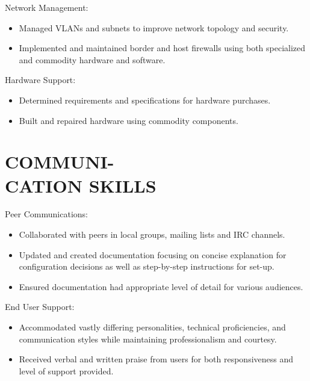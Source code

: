 \documentclass[line,margin]{res}
\begin{document}
\begin{resume}
    Network Management:
    \vspace{1 mm}
    \begin{itemize} \itemsep -1.5pt %
        \item Managed VLANs and subnets to improve network topology and
        security.
        \item Implemented and maintained border and host firewalls using
        both specialized and commodity hardware and software.
    \end{itemize}
    \vspace{-3 mm}

    Hardware Support:
    \vspace{1 mm}
    \begin{itemize} \itemsep -1.5pt %
        \item Determined requirements and specifications for hardware purchases.
        \item Built and repaired hardware using commodity components.
    \end{itemize}


\section{COMMUNI- \\ CATION SKILLS}

    Peer Communications:
    \vspace{1 mm}
    \begin{itemize} \itemsep -1.5pt %
        \item Collaborated with peers in local groups, mailing lists and
        IRC channels.
        \item Updated and created documentation focusing on concise
        explanation for configuration decisions as well as step-by-step
        instructions for set-up.
        \item Ensured documentation had appropriate level of detail for
        various audiences.
    \end{itemize}
    \vspace{-3 mm}

    End User Support:
    \vspace{1 mm}
    \begin{itemize} \itemsep -1.5pt %
        \item Accommodated vastly differing personalities, technical
        proficiencies, and communication styles while maintaining
        professionalism and courtesy.
        \item Received verbal and written praise from users for both
        responsiveness and level of support provided.
    \end{itemize}



\end{resume}
\end{document}
